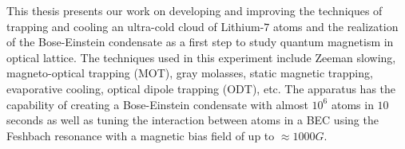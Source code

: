 %
%
%
This thesis presents our work on developing and improving the techniques of trapping and cooling an ultra-cold cloud of Lithium-$7$ atoms and the realization of the Bose-Einstein condensate as a first step to study quantum magnetism in optical lattice. The techniques used in this experiment include Zeeman slowing, magneto-optical trapping (MOT), gray molasses, static magnetic trapping, evaporative cooling, optical dipole trapping (ODT), etc. The apparatus has the capability of creating a Bose-Einstein condensate with almost $10^6$ atoms in $10$ seconds as well as tuning the interaction between atoms in a BEC using the Feshbach resonance with a magnetic bias field of up to $\approx1000G$.
